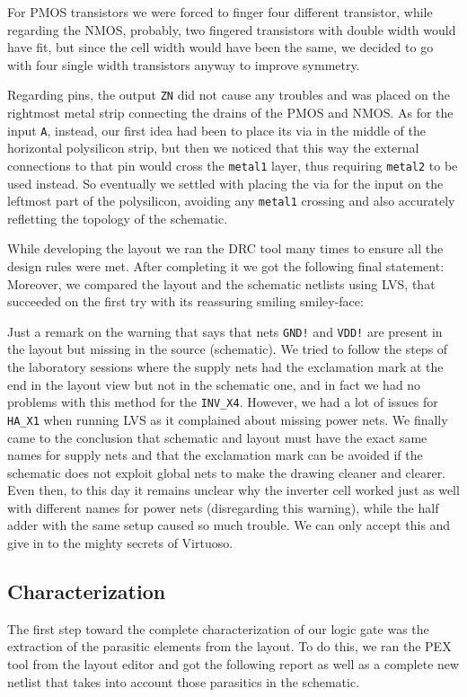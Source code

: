 \documentclass[a4paper]{article}
\newcommand{\inv}{\texttt{INV\_X4}\xspace}
\newcommand{\ha}{\texttt{HA\_X1}\xspace}
\begin{document}
For PMOS transistors we were forced to finger four different transistor, while regarding the NMOS, probably, two fingered transistors with double width would have fit, but since the cell width would have been the same, we decided to go with four single width transistors anyway to improve symmetry.

Regarding pins, the output \texttt{ZN} did not cause any troubles and was placed on the rightmost metal strip connecting the drains of the PMOS and NMOS. As for the input \texttt{A}, instead, our first idea had been to place its via in the middle of the horizontal polysilicon strip, but then we noticed that this way the external connections to that pin would cross the \texttt{metal1} layer, thus requiring \texttt{metal2} to be used instead. So eventually we settled with placing the via for the input on the leftmost part of the polysilicon, avoiding any \texttt{metal1} crossing and also accurately refletting the topology of the schematic.

While developing the layout we ran the DRC tool many times to ensure all the design rules were met. After completing it we got the following final statement:
\newpage
{}
\newpage
Moreover, we compared the layout and the schematic netlists using LVS, that succeeded on the first try with its reassuring smiling smiley-face:

Just a remark on the warning that says that nets \texttt{GND!} and \texttt{VDD!} are present in the layout but missing in the source (schematic). We tried to follow the steps of the laboratory sessions where the supply nets had the exclamation mark at the end in the layout view but not in the schematic one, and in fact we had no problems with this method for the \inv. However, we had a lot of issues for \ha when running LVS as it complained about missing power nets. We finally came to the conclusion that schematic and layout must have the exact same names for supply nets and that the exclamation mark can be avoided if the schematic does not exploit global nets to make the drawing cleaner and clearer. Even then, to this day it remains unclear why the inverter cell worked just as well with different names for power nets (disregarding this warning), while the half adder with the same setup caused so much trouble. We can only accept this and give in to the mighty secrets of Virtuoso.


\subsection{Characterization}
\label{sec: inv_char}
The first step toward the complete characterization of our logic gate was the extraction of the parasitic elements from the layout. To do this, we ran the PEX tool from the layout editor and got the following report as well as a complete new netlist that takes into account those parasitics in the schematic.
\end{document}
